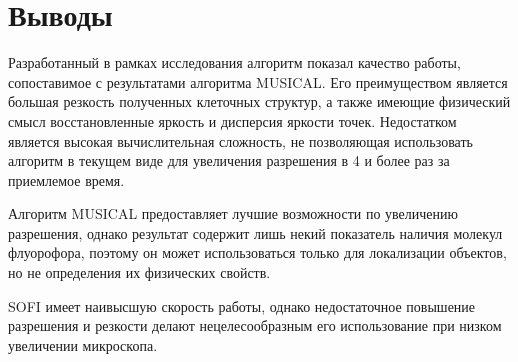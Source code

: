 \section{Выводы}

Разработанный в рамках исследования алгоритм показал качество работы, сопоставимое с результатами алгоритма MUSICAL. Его преимуществом является большая резкость полученных клеточных структур, а также имеющие физический смысл восстановленные яркость и дисперсия яркости точек. Недостатком является высокая вычислительная сложность, не позволяющая использовать алгоритм в текущем виде для увеличения разрешения в 4 и более раз за приемлемое время.

Алгоритм MUSICAL предоставляет лучшие возможности по увеличению разрешения, однако результат содержит лишь некий показатель наличия молекул флуорофора, поэтому он может использоваться только для локализации объектов, но не определения их физических свойств.

SOFI имеет наивысшую скорость работы, однако недостаточное повышение разрешения и резкости делают нецелесообразным его использование при низком увеличении микроскопа.




\FloatBarrier